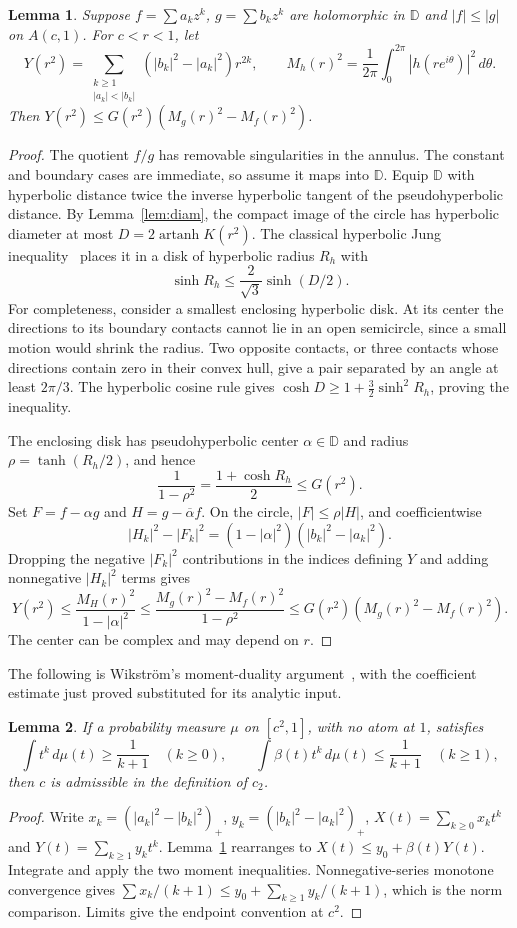 \documentclass[11pt]{article}
\newtheorem{lemma}{Lemma}
\newcommand{\D}{\mathbb D}
\begin{document}
\begin{lemma}\label{lem:coeff}
Suppose $f=\sum a_kz^k$, $g=\sum b_kz^k$ are holomorphic in $\D$ and
$|f|\le|g|$ on $A(c,1)$. For $c<r<1$, let
\[
 Y(r^2)=\sum_{\substack{k\ge1\\|a_k|<|b_k|}}
 (|b_k|^2-|a_k|^2)r^{2k},\qquad
 M_h(r)^2=\frac1{2\pi}\int_0^{2\pi}|h(re^{i\theta})|^2\,d\theta.
\]
Then $Y(r^2)\le G(r^2)(M_g(r)^2-M_f(r)^2)$.
\end{lemma}
\begin{proof}
The quotient $f/g$ has removable singularities in the annulus. The constant
and boundary cases are immediate, so assume it maps into $\D$.
Equip $\D$ with hyperbolic distance twice the inverse hyperbolic tangent of
the pseudohyperbolic distance. By Lemma~\ref{lem:diam}, the compact image of
the circle has hyperbolic diameter at most $D=2\operatorname{artanh}K(r^2)$.
The classical hyperbolic Jung inequality~\cite{BMRS} places it in a disk of
hyperbolic radius $R_h$ with
\[
 \sinh R_h\le\frac2{\sqrt3}\sinh(D/2).
\]
For completeness, consider a smallest enclosing hyperbolic disk. At its
center the directions to its boundary contacts cannot lie in an open
semicircle, since a small motion would shrink the radius. Two opposite
contacts, or three contacts whose directions contain zero in their convex
hull, give a pair separated by an angle at least $2\pi/3$. The hyperbolic
cosine rule gives $\cosh D\ge1+\tfrac32\sinh^2R_h$, proving the inequality.

The enclosing disk has pseudohyperbolic center $\alpha\in\D$ and radius
$\rho=\tanh(R_h/2)$, and hence
\[
 \frac1{1-\rho^2}=\frac{1+\cosh R_h}{2}\le G(r^2).
\]
Set $F=f-\alpha g$ and $H=g-\overline\alpha f$. On the circle,
$|F|\le\rho|H|$, and coefficientwise
\[
 |H_k|^2-|F_k|^2=(1-|\alpha|^2)(|b_k|^2-|a_k|^2).
\]
Dropping the negative $|F_k|^2$ contributions in the indices defining $Y$
and adding nonnegative $|H_k|^2$ terms gives
\[
 Y(r^2)\le\frac{M_H(r)^2}{1-|\alpha|^2}
 \le\frac{M_g(r)^2-M_f(r)^2}{1-\rho^2}
 \le G(r^2)(M_g(r)^2-M_f(r)^2).
\]
The center can be complex and may depend on $r$.
\end{proof}

The following is Wikstr\"om's moment-duality argument~\cite[Lemma 3.1]{Wikstrom},
with the coefficient estimate just proved substituted for its analytic input.
\begin{lemma}\label{lem:mom}
If a probability measure $\mu$ on $[c^2,1]$, with no atom at $1$, satisfies
\[
 \int t^k\,d\mu(t)\ge\frac1{k+1}\quad(k\ge0),\qquad
 \int\beta(t)t^k\,d\mu(t)\le\frac1{k+1}\quad(k\ge1),
\]
then $c$ is admissible in the definition of $c_2$.
\end{lemma}
\begin{proof}
Write $x_k=(|a_k|^2-|b_k|^2)_+$, $y_k=(|b_k|^2-|a_k|^2)_+$,
$X(t)=\sum_{k\ge0}x_kt^k$ and $Y(t)=\sum_{k\ge1}y_kt^k$.
Lemma~\ref{lem:coeff} rearranges to $X(t)\le y_0+\beta(t)Y(t)$.
Integrate and apply the two moment inequalities. Nonnegative-series monotone
convergence gives
$\sum x_k/(k+1)\le y_0+\sum_{k\ge1}y_k/(k+1)$, which is the norm comparison.
Limits give the endpoint convention at $c^2$.
\end{proof}
\end{document}
